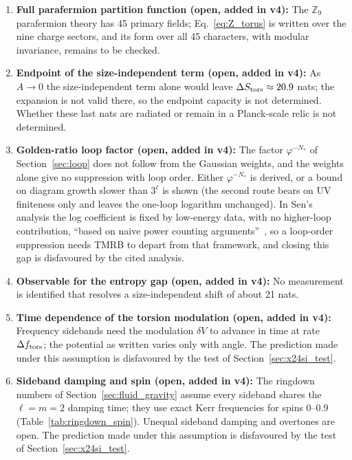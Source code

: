 \documentclass[11pt,a4paper]{article}
\begin{document}
\begin{enumerate}[leftmargin=*, label=\arabic*.]
  \item \textbf{Full parafermion partition function (open, added in v4):} The
    $\mathbb{Z}_9$ parafermion theory has 45 primary fields; Eq.~\eqref{eq:Z_torus}
    is written over the nine charge sectors, and its form over all 45 characters,
    with modular invariance, remains to be checked.

  \item \textbf{Endpoint of the size-independent term (open, added in v4):} As
    $A\to 0$ the size-independent term alone would leave $\Delta S_{\rm tors}\approx 20.9$ nats; the expansion is not valid there, so the endpoint capacity is not determined.
    Whether these last nats are radiated or remain in a Planck-scale relic is
    not determined.

  \item \textbf{Golden-ratio loop factor (open, added in v4):} The factor
    $\varphi^{-N_*}$ of Section~\ref{sec:loop} does not follow from the Gaussian
    weights, and the weights alone give no suppression with loop order. Either
    $\varphi^{-N_*}$ is derived, or a bound on diagram growth slower than
    $3^{\ell}$ is shown (the second route bears on UV finiteness only and leaves the one-loop logarithm unchanged).
    In Sen's analysis the log coefficient is fixed by low-energy data, with no higher-loop contribution, ``based on naive power counting arguments''~\cite{Sen2012}, so a loop-order suppression needs TMRB to depart from that framework, and closing this gap is disfavoured by the cited analysis.

  \item \textbf{Observable for the entropy gap (open, added in v4):} No measurement
    is identified that resolves a size-independent shift of about 21 nats.

  \item \textbf{Time dependence of the torsion modulation (open, added in v4):}
    Frequency sidebands need the modulation $\delta V$ to advance in time at rate
    $\Delta f_{\rm tors}$; the potential as written varies only with angle. The
    prediction made under this assumption is disfavoured by the test of
    Section~\ref{sec:x24si_test}.

  \item \textbf{Sideband damping and spin (open, added in v4):} The ringdown
    numbers of Section~\ref{sec:fluid_gravity} assume every sideband shares the
    $\ell = m = 2$ damping time; they use exact Kerr frequencies for spins 0--0.9
    (Table~\ref{tab:ringdown_spin}). Unequal sideband damping and overtones are open.
    The prediction made under this assumption is disfavoured by the test of
    Section~\ref{sec:x24si_test}.
\end{enumerate}
\end{document}
